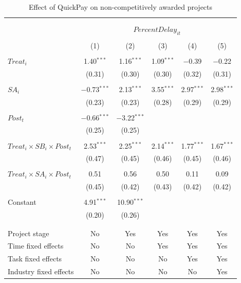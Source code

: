 \documentclass[
]{article}
\begin{document}
\begin{table}[H] \centering 
  \caption{Effect of QuickPay on non-competitively awarded projects} 
  \label{} 
\small 
\begin{tabular}{@{\extracolsep{-2pt}}lccccc} 
\\[-1.8ex]\hline 
\hline \\[-1.8ex] 
\\[-1.8ex] & \multicolumn{5}{c}{$PercentDelay_{it}$  } \\ 
\\[-1.8ex] & (1) & (2) & (3) & (4) & (5)\\ 
\hline \\[-1.8ex] 
 $Treat_i$ & 1.40$^{***}$ & 1.16$^{***}$ & 1.09$^{***}$ & $-$0.39 & $-$0.22 \\ 
  & (0.31) & (0.30) & (0.30) & (0.32) & (0.31) \\ 
  & & & & & \\ 
 $SA_i$ & $-$0.73$^{***}$ & 2.13$^{***}$ & 3.55$^{***}$ & 2.97$^{***}$ & 2.98$^{***}$ \\ 
  & (0.23) & (0.23) & (0.28) & (0.29) & (0.29) \\ 
  & & & & & \\ 
 $Post_t$ & $-$0.66$^{***}$ & $-$3.22$^{***}$ &  &  &  \\ 
  & (0.25) & (0.25) &  &  &  \\ 
  & & & & & \\ 
 $Treat_i \times SB_i \times Post_t$ & 2.53$^{***}$ & 2.25$^{***}$ & 2.14$^{***}$ & 1.77$^{***}$ & 1.67$^{***}$ \\ 
  & (0.47) & (0.45) & (0.46) & (0.45) & (0.46) \\ 
  & & & & & \\ 
 $Treat_i \times SA_i \times Post_t$ & 0.51 & 0.56 & 0.50 & 0.11 & 0.09 \\ 
  & (0.45) & (0.42) & (0.43) & (0.42) & (0.42) \\ 
  & & & & & \\ 
 Constant & 4.91$^{***}$ & 10.90$^{***}$ &  &  &  \\ 
  & (0.20) & (0.26) &  &  &  \\ 
  & & & & & \\ 
\hline \\[-1.8ex] 
Project stage & No & Yes & Yes & Yes & Yes \\ 
Time fixed effects & No & No & Yes & Yes & Yes \\ 
Task fixed effects & No & No & No & Yes & Yes \\ 
Industry fixed effects & No & No & No & No & Yes \\ 

\end{tabular}
\end{table}
\end{document}
